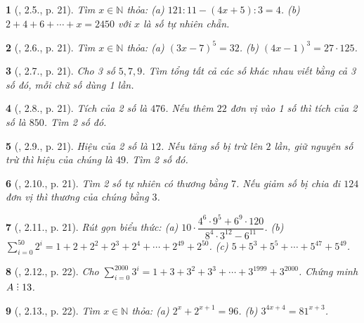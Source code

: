 \documentclass{article}
\newtheorem{baitoan}{}
\DeclareRobustCommand{\divby}{%
	\mathrel{\vbox{\baselineskip.65ex\lineskiplimit0pt\hbox{.}\hbox{.}\hbox{.}}}%
}
\begin{document}
\begin{baitoan}[\cite{Binh_boi_duong_Toan_6_tap_1}, 2.5., p. 21]
	Tìm $x\in\mathbb{N}$ thỏa: (a) $121:11 - (4x + 5):3 = 4$. (b) $2 + 4 + 6 + \cdots + x = 2450$ với $x$ là số tự nhiên chẵn.
\end{baitoan}

\begin{baitoan}[\cite{Binh_boi_duong_Toan_6_tap_1}, 2.6., p. 21]
	Tìm $x\in\mathbb{N}$ thỏa: (a) $(3x - 7)^5 = 32$. (b) $(4x - 1)^3 = 27\cdot125$.
\end{baitoan}

\begin{baitoan}[\cite{Binh_boi_duong_Toan_6_tap_1}, 2.7., p. 21]
	Cho 3 số $5,7,9$. Tìm tổng tất cả các số khác nhau viết bằng cả 3 số đó, mỗi chữ số dùng 1 lần.
\end{baitoan}

\begin{baitoan}[\cite{Binh_boi_duong_Toan_6_tap_1}, 2.8., p. 21]
	Tích của 2 số là $476$. Nếu thêm $22$ đơn vị vào 1 số thì tích của 2 số là $850$. Tìm 2 số đó.
\end{baitoan}

\begin{baitoan}[\cite{Binh_boi_duong_Toan_6_tap_1}, 2.9., p. 21]
	Hiệu của 2 số là $12$. Nếu tăng số bị trừ lên $2$ lần, giữ nguyên số trừ thì hiệu của chúng là $49$. Tìm 2 số đó.
\end{baitoan}

\begin{baitoan}[\cite{Binh_boi_duong_Toan_6_tap_1}, 2.10., p. 21]
	Tìm 2 số tự nhiên có thương bằng $7$. Nếu giảm số bị chia đi $124$ đơn vị thì thương của chúng bằng $3$.
\end{baitoan}

\begin{baitoan}[\cite{Binh_boi_duong_Toan_6_tap_1}, 2.11., p. 21]
	Rút gọn biểu thức: (a) $10\cdot\dfrac{4^6\cdot9^5 + 6^9\cdot120}{8^4\cdot3^{12} - 6^{11}}$. (b) $\sum_{i=0}^{50} 2^i = 1 + 2 + 2^2 + 2^3 + 2^4 + \cdots + 2^{49} + 2^{50}$. (c) $5 + 5^3 + 5^5 + \cdots + 5^{47} + 5^{49}$.
\end{baitoan}

\begin{baitoan}[\cite{Binh_boi_duong_Toan_6_tap_1}, 2.12., p. 22]
	Cho $\sum_{i=0}^{2000} 3^i = 1 + 3 + 3^2 + 3^3 + \cdots + 3^{1999} + 3^{2000}$. Chứng minh $A\divby13$.
\end{baitoan}

\begin{baitoan}[\cite{Binh_boi_duong_Toan_6_tap_1}, 2.13., p. 22]
	Tìm $x\in\mathbb{N}$ thỏa: (a) $2^x + 2^{x + 1} = 96$. (b) $3^{4x + 4} = 81^{x + 3}$.
\end{baitoan}
\end{document}
